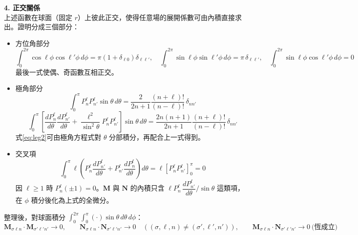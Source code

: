 \textbf{4. 正交關係}\\
上述函數在球面（固定 $r$）上彼此正交，使得任意場的展開係數可由內積直接求出。證明分成三個部分：
\begin{itemize}
    \item[(1)] {方位角部分
        \begin{equation}
            \int_0^{2\pi} \cos\ell\phi \cos\ell'\phi\, d\phi = \pi\left(1 + \delta_{\ell 0}\right)\delta_{\ell\ell'}, \quad \int_0^{2\pi} \sin\ell\phi \sin\ell'\phi\, d\phi = \pi\,\delta_{\ell\ell'}, \quad \int_0^{2\pi} \sin\ell\phi \cos\ell'\phi\, d\phi = 0
        \end{equation}
        最後一式使偶、奇函數互相正交。
        }
    \item[(2)] {極角部分
        \begin{equation}
            \int_0^{\pi} P_n^{\ell} P_{n'}^{\ell} \sin\theta\, d\theta = \frac{2}{2n+1} \frac{(n+\ell)!}{(n-\ell)!}\, \delta_{nn'}
        \end{equation}
        \begin{equation}
            \int_0^{\pi} \left[ \frac{dP_n^{\ell}}{d\theta} \frac{dP_{n'}^{\ell}}{d\theta} + \frac{\ell^2}{\sin^2\theta} P_n^{\ell} P_{n'}^{\ell} \right] \sin\theta\, d\theta = \frac{2n(n+1)}{2n+1} \frac{(n+\ell)!}{(n-\ell)!}\, \delta_{nn'} \label{eq:leg2}
        \end{equation}
        式\eqref{eq:leg2}可由極角方程式對 $\theta$ 分部積分，再配合上一式得到。
        }
    \item[(3)] {交叉項
        \begin{equation}
            \int_0^{\pi} \ell \left( P_n^{\ell} \frac{dP_{n'}^{\ell}}{d\theta} + P_{n'}^{\ell} \frac{dP_n^{\ell}}{d\theta} \right) d\theta = \ell \left[ P_n^{\ell} P_{n'}^{\ell} \right]_0^{\pi} = 0
        \end{equation}
        因 $\ell \geq 1$ 時 $P_n^{\ell}\left(\pm 1\right) = 0$。$\mathbf{M}$ 與 $\mathbf{N}$ 的內積只含 $\ell P_n^{\ell}\, \dfrac{dP_{n'}^{\ell}}{d\theta} / \sin\theta$ 這類項，在 $\phi$ 積分後化為上式的全微分。
        }
\end{itemize}
整理後，對球面積分 $\displaystyle \int_0^{2\pi}\!\!\int_0^{\pi} \left(\cdot\right) \sin\theta\, d\theta\, d\phi$：
\begin{equation}
    \mathbf{M}_{\sigma\ell n} \cdot \mathbf{M}_{\sigma'\ell'n'} \to 0, \qquad \mathbf{N}_{\sigma\ell n} \cdot \mathbf{N}_{\sigma'\ell'n'} \to 0 \quad \left(\left(\sigma,\ell,n\right) \neq \left(\sigma',\ell',n'\right)\right), \qquad \mathbf{M}_{\sigma\ell n} \cdot \mathbf{N}_{\sigma'\ell'n'} \to 0 \ \text{(恆成立)}
\end{equation}
